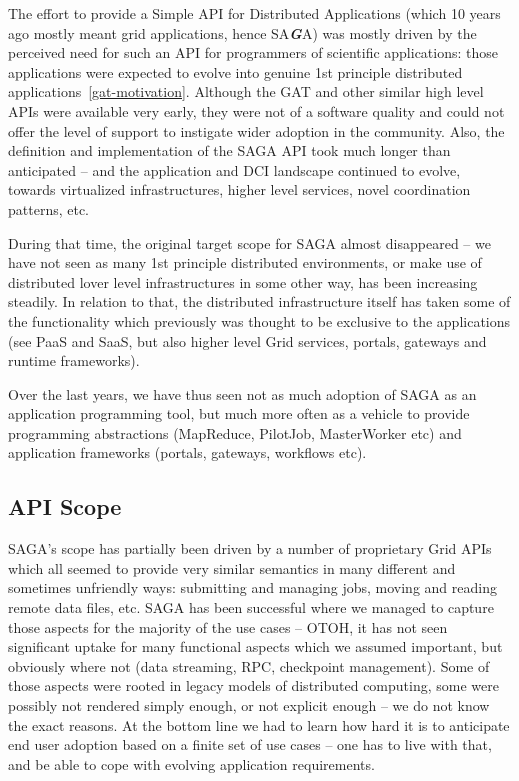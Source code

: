 \documentclass{article}
\newcommand{\BI}[1]{\textbf{\textit{#1}}}
\begin{document}
  The effort to provide a Simple API for Distributed Applications
  (which 10 years ago mostly meant grid applications, hence SA\BI{G}A)
  was mostly driven by the perceived need for such an API for
  programmers of scientific applications: those applications were
  expected to evolve into genuine 1st principle distributed
  applications~\ref{gat-motivation}.  Although the GAT and other
  similar high level APIs were available very early, they were not of
  a software quality and could not offer the level of support to
  instigate wider adoption in the community.  Also, the definition and
  implementation of the SAGA API took much longer than anticipated --
  and the application and DCI landscape continued to evolve, towards
  virtualized infrastructures, higher level services, novel
  coordination patterns, etc.
  
  During that time, the original target scope for SAGA almost
  disappeared -- we have not seen as many 1st principle distributed
  environments, or make use of distributed lover level infrastructures
  in some other way, has been increasing steadily.  In relation to
  that, the distributed infrastructure itself has taken some of the
  functionality which previously was thought to be exclusive to the
  applications (see PaaS and SaaS, but also higher level Grid
  services, portals, gateways and runtime frameworks).

  Over the last years, we have thus seen not as much adoption of SAGA
  as an application programming tool, but much more often as a vehicle
  to provide programming abstractions (MapReduce, PilotJob,
  MasterWorker etc) and application frameworks (portals, gateways,
  workflows etc).


 \subsection{API Scope}

  SAGA's scope has partially been driven by a number of proprietary
  Grid APIs which all seemed to provide very similar semantics in many
  different and sometimes unfriendly ways: submitting and managing
  jobs, moving and reading remote data files, etc.  SAGA has been
  successful where we managed to capture those aspects for the
  majority of the use cases -- OTOH, it has not seen significant
  uptake for many functional aspects which we assumed important, but
  obviously where not (data streaming, RPC, checkpoint management).
  Some of those aspects were rooted in legacy models of distributed
  computing, some were possibly not rendered simply enough, or not
  explicit enough -- we do not know the exact reasons.  At the bottom
  line we had to learn how hard it is to anticipate end user adoption
  based on a finite set of use cases -- one has to live with that, and
  be able to cope with evolving application requirements.
\end{document}

